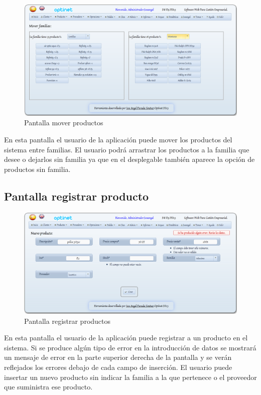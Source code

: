 \documentclass[a4paper,11pt]{book}
\begin{document}
\begin{figure}[!htb]
  \centering
    \includegraphics[scale=0.35]{capmoverproductos.png}
  \caption{Pantalla mover productos}
  \label{a}
\end{figure}

En esta pantalla el usuario de la aplicación puede mover los productos del sistema entre familias. El usuario podrá arrastrar los productos a la familia que desee o dejarlos sin familia ya que en el desplegable también aparece la opción de productos sin familia.

\subsection {Pantalla registrar producto}

\begin{figure}[!htb]
  \centering
    \includegraphics[scale=0.35]{capregistroproducto.png}
  \caption{Pantalla registrar productos}
  \label{a}
\end{figure}

En esta pantalla el usuario de la aplicación puede registrar a un producto en el sistema. Si se produce algún tipo de error en la introducción de datos se mostrará un mensaje de error en la parte superior derecha de la pantalla y se verán reflejados los errores debajo de cada campo de inserción. El usuario puede insertar un nuevo producto sin indicar la familia a la que pertenece o el proveedor que suministra ese producto.
\end{document}
